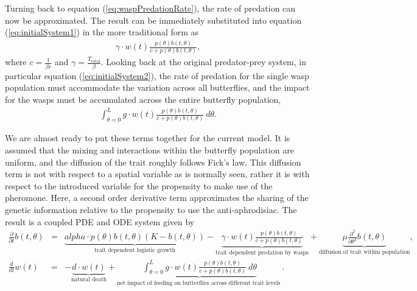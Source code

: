 \documentclass[review,authoryear]{elsarticle}
\def\alpha{alpha}%
\newcommand{\origB}{{b}}
\newcommand{\origW}{{w}}
\newcommand{\origAlpha}{{\alpha}}
\newcommand{\origK}{{K}}
\newcommand{\origGamma}{{\gamma}}
\newcommand{\origC}{{c}}
\newcommand{\origD}{{d}}
\newcommand{\origG}{{g}}
\newcommand{\origL}{{L}}
\newcommand{\origP}[1]{{p}(#1)}
\newcommand{\origTheta}{{\theta}}
\newcommand{\origT}{{t}}
\newcommand{\origMu}{{\mu}}
\begin{document}
Turning back to equation (\ref{eq:waspPredationRate}), the rate of
predation can now be approximated.  The result can be immediately
substituted into equation (\ref{eq:initialSystem1}) in the more
traditional form as
\begin{eqnarray}
  \label{eq:butterflyPredationRate}
  \origGamma \cdot w(\origT) \frac{\origP{\origTheta} \origB(\origT,\origTheta) }{\origC +  \origP{\origTheta} \origB(\origT,\origTheta)},
\end{eqnarray}
where $\origC=\frac{1}{\beta r}$ and
$\origGamma=\frac{T_{\mathrm{total}}}{\beta}$.  Looking back at the
original predator-prey system, in particular equation
(\ref{eq:initialSystem2}), the rate of predation for the single wasp
population must accommodate the variation across all butterflies, and
the impact for the wasps must be accumulated across the entire
butterfly population,
\begin{eqnarray}
  \label{eq:totalWaspPredationRate}
  \int^{\origL}_{\origTheta=0} \origG \cdot \origW(\origT) \frac{\origP{\origTheta} \origB(\origT,\origTheta) }{\origC + \origP{\origTheta} \origB(\origT,\origTheta)} ~ d\origTheta.
\end{eqnarray}

We are almost ready to put these terms together for the current
model. It is assumed that the mixing and interactions within the
butterfly population are uniform, and the diffusion of the trait
roughly follows Fick's law\citep{logan2006applied}. This diffusion term is not with respect to a spatial variable as is normally seen, rather it is with respect to the introduced variable for the propensity to make use of the pheromone. Here, a second
order derivative term approximates the sharing of the genetic
information relative to the propensity to use the
anti-aphrodisiac. The result is a coupled PDE and ODE system given by
\begin{eqnarray}
  \label{eq:odePDE1}
  \frac{\partial}{\partial \origT} \origB(\origT,\origTheta) & = &
     \underbrace{  \origAlpha \cdot \origP{\origTheta} \origB(\origT,\origTheta) (\origK - \origB(\origT,\origTheta)) }_\text{trait dependent logistic growth}
      -  \underbrace{\origGamma \cdot \origW(\origT) \frac{\origP{\origTheta} \origB(\origT,\origTheta)}{\origC+\origP{\origTheta}\origB(\origT,\origTheta)} }_\text{trait dependent predation by wasps}
      +  \underbrace{\origMu \frac{\partial^2}{\partial \origTheta^2} \origB(\origT,\origTheta)}_\text{diffusion of trait within population}, \\
  \label{eq:odePDE2}
  \frac{d}{d\origT} \origW(\origT) & = & - \underbrace{ \origD \cdot \origW(\origT) }_\text{natural death}  +
        \underbrace{
          \int^{\origL}_{\origTheta=0} \origG \cdot \origW(\origT) \frac{\origP{\origTheta} \origB(\origT,\origTheta) }{\origC + \origP{\origTheta} \origB(\origT,\origTheta)} ~ d\origTheta
       }_\text{net impact of feeding on butterflies across different trait levels }.
\end{eqnarray}
\end{document}
